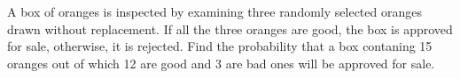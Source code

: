 \begin{flushleft}
A box of oranges is inspected by examining three randomly selected oranges drawn without replacement. If all the three oranges are good, the box is approved for sale, otherwise, it is rejected. Find the probability that a box contaning 15 oranges out of which 12 are good and 3 are bad ones will be approved for sale.
\end{flushleft}